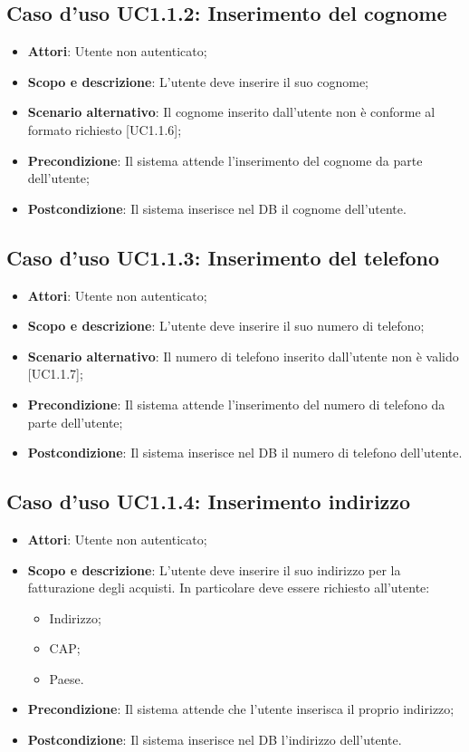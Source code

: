 \documentclass[12pt,a4paper,titlepage]{article}
\begin{document}
	\subsection{Caso d'uso UC1.1.2: Inserimento del cognome}
	\label{UC1.1.2}
	\begin{itemize}
		\item \textbf{Attori}: Utente non autenticato;
		\item \textbf{Scopo e descrizione}: L'utente deve inserire il suo cognome;
		\item \textbf{Scenario alternativo}: Il cognome inserito dall'utente non è conforme al formato richiesto [UC1.1.6];
		\item \textbf{Precondizione}: Il sistema attende l'inserimento del cognome da parte dell'utente;
		\item \textbf{Postcondizione}: Il sistema inserisce nel DB il cognome dell'utente.
	\end{itemize}
	\subsection{Caso d'uso UC1.1.3: Inserimento del telefono}
	\label{UC1.1.3}
	\begin{itemize}
		\item \textbf{Attori}: Utente non autenticato;
		\item \textbf{Scopo e descrizione}: L'utente deve inserire il suo numero di telefono;
		\item \textbf{Scenario alternativo}: Il numero di telefono inserito dall'utente non è valido [UC1.1.7];
		\item \textbf{Precondizione}: Il sistema attende l'inserimento del numero di telefono da parte dell'utente;
		\item \textbf{Postcondizione}: Il sistema inserisce nel DB il numero di telefono dell'utente.
	\end{itemize}
	\subsection{Caso d'uso UC1.1.4: Inserimento indirizzo}
	\label{UC1.1.4}
	\begin{itemize}
		\item \textbf{Attori}: Utente non autenticato;
		\item \textbf{Scopo e descrizione}: L'utente deve inserire il suo indirizzo per la fatturazione degli acquisti. In particolare deve essere richiesto all'utente:
		\begin{itemize}
			\item Indirizzo;
			\item CAP;
			\item Paese.
		\end{itemize}
		\item \textbf{Precondizione}: Il sistema attende che l'utente inserisca il proprio indirizzo;
		\item \textbf{Postcondizione}: Il sistema inserisce nel DB l'indirizzo dell'utente.
	\end{itemize}
\end{document}
